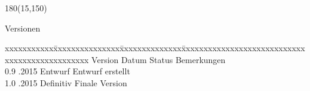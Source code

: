 \begin{textblock}{180}(15,150)
\color{black}
\begin{huge}
Versionen
\end{huge}
\vspace{10mm}

\fontsize{10pt}{18pt}\selectfont
\begin{tabbing}
xxxxxxxxxxx\=xxxxxxxxxxxxxxx\=xxxxxxxxxxxxxx\=xxxxxxxxxxxxxxxxxxxxxxxxxxxxxxxxxxxxxxxxxxxxxxx \kill
Version	\> Datum	\> Status		\> Bemerkungen		\\
0.9	.2015	\> Entwurf		\> Entwurf erstellt	\\	
1.0	.2015	\> Definitiv		\> Finale Version	\\	
\end{tabbing}

\end{textblock}
